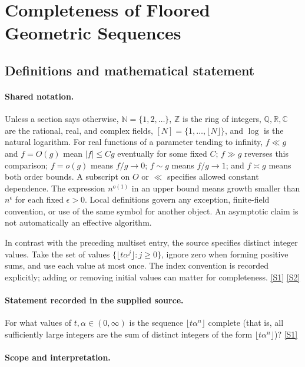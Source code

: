 \documentclass[11pt,a4paper]{article}
\newcommand{\N}{\mathbb{N}}
\newcommand{\Z}{\mathbb{Z}}
\newcommand{\Q}{\mathbb{Q}}
\newcommand{\R}{\mathbb{R}}
\newcommand{\C}{\mathbb{C}}
\newcommand{\sref}[2]{\hyperlink{source:#1:#2}{[S#2]}}
\begin{document}
\section{Completeness of Floored Geometric Sequences}\label{statement}


\subsection{Definitions and mathematical statement}

\paragraph{Shared notation.}Unless a section says otherwise, $\N=\{1,2,\ldots\}$,
$\Z$ is the ring of integers, $\Q,\R,\C$ are the rational, real, and complex
fields, $[N]=\{1,\ldots,\lfloor N\rfloor\}$, and $\log$ is the natural
logarithm. For real functions of a parameter tending to infinity,
$f\ll g$ and $f=O(g)$ mean $|f|\leq Cg$ eventually for some fixed $C$;
$f\gg g$ reverses this comparison; $f=o(g)$ means $f/g\to0$;
$f\sim g$ means $f/g\to1$; and $f\asymp g$ means both order bounds.
A subscript on $O$ or $\ll$ specifies allowed constant dependence.
The expression $n^{o(1)}$ in an upper bound means growth smaller than
$n^\epsilon$ for each fixed $\epsilon>0$. Local definitions govern any
exception, finite-field convention, or use of the same symbol for another
object. An asymptotic claim is not automatically an effective algorithm.



In contrast with the preceding multiset entry, the source specifies distinct integer values. Take the set of values $\{\lfloor t\alpha^j\rfloor:j\geq0\}$, ignore zero when forming positive sums, and use each value at most once. The index convention is recorded explicitly; adding or removing initial values can matter for completeness. \sref{statement}{1} \sref{statement}{2}

\paragraph{Statement recorded in the supplied source.}
For what values of $t,\alpha \in (0,\infty)$ is the sequence $\lfloor t\alpha^n\rfloor$ complete (that is, all sufficiently large integers are the sum of distinct integers of the form $\lfloor t\alpha^n\rfloor$)? \sref{statement}{1}

\paragraph{Scope and interpretation.}
\end{document}
